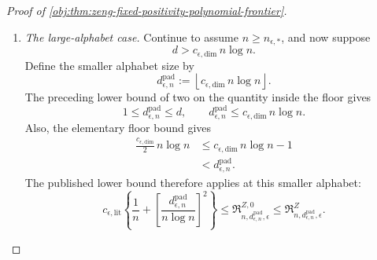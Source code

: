 \documentclass[11pt]{article}
\begin{document}
\begin{proof}[Proof of \cref{obj:thm:zeng-fixed-positivity-polynomial-frontier}]
\begin{enumerate}
First suppose \(n\ge n_{\epsilon,*}\). Then
\[
n\ge n_{\epsilon,\mathrm{lit}},
\qquad
n\ge3,
\qquad
\log n>1,
\qquad
n\log n>0.
\]
Furthermore, the choice of \(n_{\epsilon,1}\) gives
\[
2\le c_{\epsilon,\mathrm{dim}}\,n
\le c_{\epsilon,\mathrm{dim}}\,n\log n.
\]
If
\[
d\le c_{\epsilon,\mathrm{dim}}\,n\log n,
\]
the published bound and subclass inclusion imply
\[
c_{\epsilon,\mathrm{lit}}
\left\{
\frac1n+\left[\frac d{n\log n}\right]^2
\right\}
\le
\mathfrak R^{Z,0}_{n,d,\epsilon}
\le
\mathfrak R^Z_{n,d,\epsilon}.
\]
Since
\[
0<\log n\le\log(e+n),
\qquad
0\le\frac d{n\log(e+n)}
\le\frac d{n\log n},
\]
we have
\[
r^{\mathrm{fix}}_{n,d}
\le
\frac1n+\left[\frac d{n\log(e+n)}\right]^2
\le
\frac1n+\left[\frac d{n\log n}\right]^2.
\]
Using \(c_\epsilon\le c_{\epsilon,\mathrm{lit}}\) gives
\[
\begin{split}
c_\epsilon r^{\mathrm{fix}}_{n,d}
&\le
c_\epsilon
\left\{
\frac1n+\left[\frac d{n\log n}\right]^2
\right\}\\
&\le
c_{\epsilon,\mathrm{lit}}
\left\{
\frac1n+\left[\frac d{n\log n}\right]^2
\right\}
\le
\mathfrak R^Z_{n,d,\epsilon}.
\end{split}
\]

\item \textit{The large-alphabet case.}
Continue to assume \(n\ge n_{\epsilon,*}\), and now suppose
\[
d>c_{\epsilon,\mathrm{dim}}\,n\log n.
\]
Define the smaller alphabet size by
\[
d_{\epsilon,n}^{\mathrm{pad}}
:=
\left\lfloor c_{\epsilon,\mathrm{dim}}\,n\log n\right\rfloor.
\]
The preceding lower bound of two on the quantity inside the floor gives
\[
1\le d_{\epsilon,n}^{\mathrm{pad}}\le d,
\qquad
d_{\epsilon,n}^{\mathrm{pad}}
\le c_{\epsilon,\mathrm{dim}}\,n\log n.
\]
Also, the elementary floor bound gives
\[
\begin{split}
\frac{c_{\epsilon,\mathrm{dim}}}{2}\,n\log n
&\le c_{\epsilon,\mathrm{dim}}\,n\log n-1\\
&<d_{\epsilon,n}^{\mathrm{pad}}.
\end{split}
\]
The published lower bound therefore applies at this smaller alphabet:
\[
c_{\epsilon,\mathrm{lit}}
\left\{
\frac1n+
\left[
\frac{d_{\epsilon,n}^{\mathrm{pad}}}{n\log n}
\right]^2
\right\}
\le
\mathfrak R^{Z,0}_{n,d_{\epsilon,n}^{\mathrm{pad}},\epsilon}
\le
\mathfrak R^Z_{n,d_{\epsilon,n}^{\mathrm{pad}},\epsilon}.
\]


\end{enumerate}
\end{proof}
\end{document}
